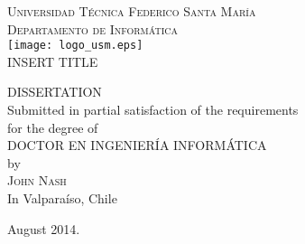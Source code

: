 \thispagestyle{empty}
\vspace{1.5in}
\begin{center}
{\textsc{Universidad T\'ecnica Federico Santa Mar\'ia}}\\
{\textsc{Departamento de Inform\'atica}}\\
\medskip
\texttt{[image: logo\_usm.eps]}
\bigskip
\bigskip
\bigskip
\bigskip \\
{\textsc{\Large{{INSERT TITLE}}}}\\%

\bigskip
\bigskip
\bigskip
\bigskip
\bigskip 

{\MakeUppercase{Dissertation}\\
\bigskip
\bigskip
Submitted in partial satisfaction of the requirements\\
for the degree of\\
\bigskip
\bigskip
\MakeUppercase{Doctor en Ingenier\'ia Inform\'atica}\\
\bigskip
\bigskip
by\\
\bigskip
{\textsc{\large{John Nash}}}\\
\bigskip
\bigskip
In Valpara\'iso, Chile}
\end{center}

\begin{center}
{\normalsize August 2014.}
\end{center}

\pagebreak

